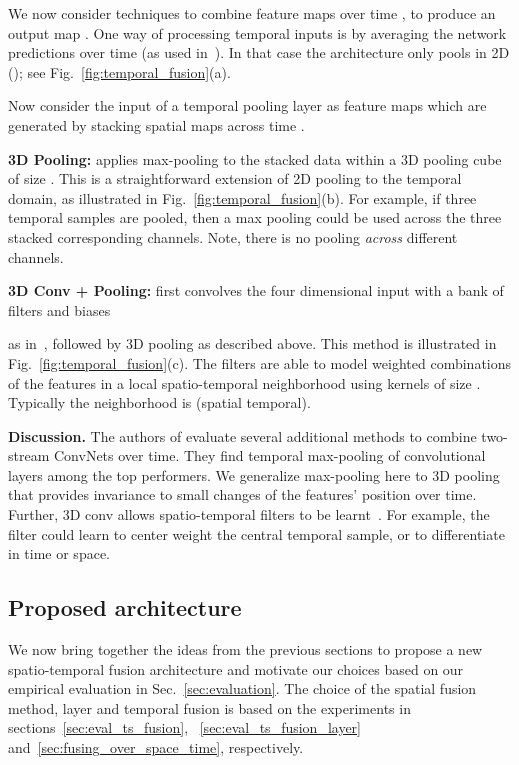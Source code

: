 \documentclass[10pt,twocolumn,letterpaper]{article}
\begin{document}
We now consider techniques to combine feature maps  over time
, to produce an output map . One way of processing temporal inputs is by averaging the network predictions over time (as used in~\cite{Simonyan14b}). In that case the architecture only pools in 2D (); see Fig.~\ref{fig:temporal_fusion}(a). 


Now consider the input of a temporal pooling layer as feature maps   which are generated by stacking spatial maps across time .

\textbf{3D Pooling:} 
applies max-pooling to the stacked data within a 3D pooling cube of
size . This is a straightforward extension of
2D pooling to the temporal domain, as illustrated in
Fig.~\ref{fig:temporal_fusion}(b). For example, if three temporal samples
are pooled, then a  max pooling could be used
across the three stacked corresponding channels. Note, there is no
pooling {\em across} different channels.

\textbf{3D Conv + Pooling:} first convolves the four dimensional input   with a bank of  filters  and biases  

as \eg in~\cite{C3DICCV2015}, followed by 3D
pooling as described above. This
method is illustrated in Fig.~\ref{fig:temporal_fusion}(c).
The filters
 are able to model weighted combinations of the features in
a local spatio-temporal neighborhood using kernels of size
. Typically the neighborhood
is  (spatial  temporal).

\textbf{Discussion.} The authors of \cite{ng2015beyond}
evaluate several additional methods to combine two-stream ConvNets
over time. They find temporal max-pooling of convolutional layers
among the top performers. We generalize max-pooling here to 3D pooling that provides invariance to small changes of the features' position over time.
Further, 3D conv allows spatio-temporal filters to be learnt~\cite{C3DICCV2015,Taylor10}.
For example, the filter could learn to center weight the central temporal
sample, or to differentiate in time or space.

\subsection{Proposed architecture}  \label{sec:architecture}

We now bring together the ideas from the previous sections to propose
a new spatio-temporal fusion architecture and motivate our choices
based on our empirical evaluation in Sec.~\ref{sec:evaluation}. The
choice of the spatial fusion method, layer and temporal fusion is based
on the experiments in sections~\ref{sec:eval_ts_fusion},
~\ref{sec:eval_ts_fusion_layer} and~\ref{sec:fusing_over_space_time},
respectively.
\end{document}
